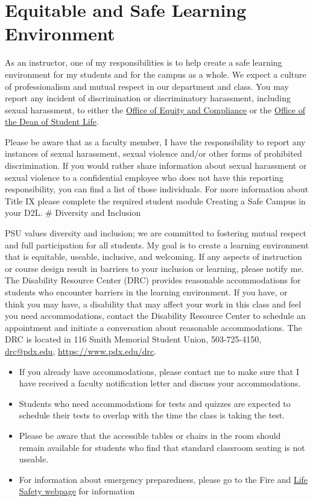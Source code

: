 \documentclass[11pt,]{article}
\begin{document}
\section{Equitable and Safe Learning
Environment}\label{equitable-and-safe-learning-environment}

As an instructor, one of my responsibilities is to help create a safe
learning environment for my students and for the campus as a whole. We
expect a culture of professionalism and mutual respect in our department
and class. You may report any incident of discrimination or
discriminatory harassment, including sexual harassment, to either the
\href{https://www.pdx.edu/diversity/office-of-equity-compliance}{Office
of Equity and Compliance} or the \href{https://www.pdx.edu/dos/}{Office
of the Dean of Student Life}.

Please be aware that as a faculty member, I have the responsibility to
report any instances of sexual harassment, sexual violence and/or other
forms of prohibited discrimination. If you would rather share
information about sexual harassment or sexual violence to a confidential
employee who does not have this reporting responsibility, you can find a
list of those individuals. For more information about Title IX please
complete the required student module Creating a Safe Campus in your D2L.
\# Diversity and Inclusion

PSU values diversity and inclusion; we are committed to fostering mutual
respect and full participation for all students. My goal is to create a
learning environment that is equitable, useable, inclusive, and
welcoming. If any aspects of instruction or course design result in
barriers to your inclusion or learning, please notify me. The Disability
Resource Center (DRC) provides reasonable accommodations for students
who encounter barriers in the learning environment. If you have, or
think you may have, a disability that may affect your work in this class
and feel you need accommodations, contact the Disability Resource Center
to schedule an appointment and initiate a conversation about reasonable
accommodations. The DRC is located in 116 Smith Memorial Student Union,
503-725-4150, \url{drc@pdx.edu}, \url{https://www.pdx.edu/drc}.

\begin{itemize}
\item
  If you already have accommodations, please contact me to make sure
  that I have received a faculty notification letter and discuss your
  accommodations.
\item
  Students who need accommodations for tests and quizzes are expected to
  schedule their tests to overlap with the time the class is taking the
  test.
\item
  Please be aware that the accessible tables or chairs in the room
  should remain available for students who find that standard classroom
  seating is not useable.
\item
  For information about emergency preparedness, please go to the Fire
  and
  \href{https://www.pdx.edu/environmental-health-safety/fire-and-life-safety}{Life
  Safety webpage} for information
\end{itemize}
\end{document}
